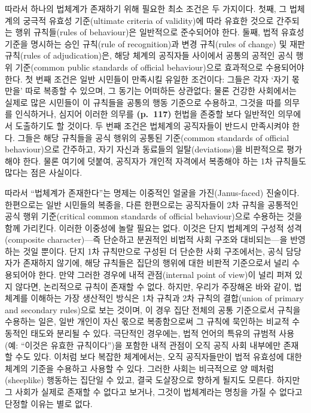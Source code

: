 따라서 하나의 법체계가 존재하기 위해 필요한 최소 조건은 두 가지이다.
첫째, 그 법체계의 궁극적 유효성 기준(ultimate criteria of validity)에
따라 유효한 것으로 간주되는 행위 규칙들(rules of behaviour)은 일반적으로
준수되어야 한다. 둘째, 법적 유효성 기준을 명시하는 승인 규칙(rule of
recognition)과 변경 규칙(rules of change) 및 재판 규칙(rules of
adjudication)은, 해당 체계의 공직자들 사이에서 공통의 공적인 공식 행위
기준(common public standards of official behaviour)으로 효과적으로
수용되어야 한다. 첫 번째 조건은 일반 시민들이 만족시킬  유일한 조건이다: 그들은 각자 `자기 몫만을' 따로 복종할 수
있으며, 그 동기는 어떠하든 상관없다; 물론 건강한 사회에서는 실제로 많은
시민들이 이 규칙들을 공통의 행동 기준으로 수용하고, 그것을 따를 의무를
인식하거나, 심지어 이러한 의무를 \textbf{(p.~117)} 헌법을 존중할 보다
일반적인 의무에서 도출하기도 할 것이다. 두 번째 조건은 법체계의
공직자들이 반드시 만족시켜야 한다. 그들은 해당 규칙들을 공식 행위의
공통된 기준(common standards of official behaviour)으로 간주하고, 자기
자신과 동료들의 일탈(deviations)을 비판적으로 평가해야 한다. 물론 여기에
덧붙여, 공직자가 개인적 자격에서 복종해야 하는 1차 규칙들도 많다는 점은
사실이다.

따라서 ``법체계가 존재한다''는 명제는 이중적인 얼굴을 가진(Janus-faced)
진술이다. 한편으로는 일반 시민들의 복종을, 다른 한편으로는 공직자들이
2차 규칙을 공통적인 공식 행위 기준(critical common standards of official
behaviour)으로 수용하는 것을 함께 가리킨다. 이러한 이중성에 놀랄 필요는
없다. 이것은 단지 법체계의 구성적 성격(composite character)---즉
단순하고 분권적인 비법적 사회 구조와 대비되는---을 반영하는 것일 뿐이다.
단지 1차 규칙만으로 구성된 더 단순한 사회 구조에서는, 공식 담당자가
존재하지 않기에, 해당 규칙들은 집단의 행위에 대한 비판적 기준으로서 널리
수용되어야 한다. 만약 그러한 경우에 내적 관점(internal point of view)이
널리 퍼져 있지 않다면, 논리적으로 규칙이 존재할 수 없다. 하지만, 우리가
주장해온 바와 같이, 법체계를 이해하는 가장 생산적인 방식은 1차 규칙과
2차 규칙의 결합(union of primary and secondary rules)으로 보는 것이며,
이 경우 집단 전체의 공통 기준으로서 규칙을 수용하는 일은, 일반 개인이
자신 몫으로 복종함으로써 그 규칙에 묵인하는 비교적 수동적인 태도와
분리될 수 있다. 극단적인 경우에는, 법적 언어의 특유의 규범적 사용(예:
``이것은 유효한 규칙이다'')을 포함한 내적 관점이 오직 공직 사회 내부에만
존재할 수도 있다. 이처럼 보다 복잡한 체계에서는, 오직 공직자들만이 법적
유효성에 대한 체계의 기준을 수용하고 사용할 수 있다. 그러한 사회는
비극적으로 양 떼처럼(sheeplike) 행동하는 집단일 수 있고, 결국 도살장으로
향하게 될지도 모른다. 하지만 그 사회가 실제로 존재할 수 없다고 보거나,
그것이 법체계라는 명칭을 가질 수 없다고 단정할 이유는 별로 없다.

